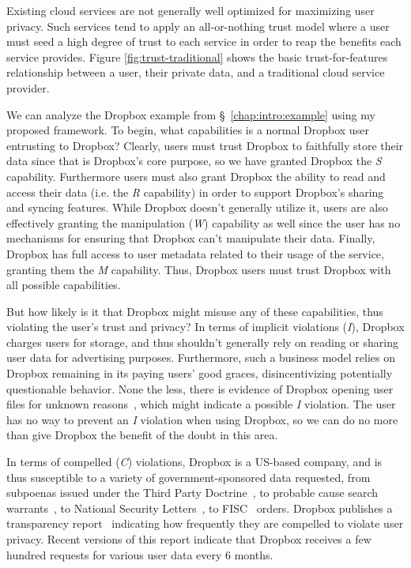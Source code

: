 Existing cloud services are not generally well optimized for
maximizing user privacy. Such services tend to apply an all-or-nothing
trust model where a user must seed a high degree of trust to each
service in order to reap the benefits each service provides. Figure
\ref{fig:trust-traditional} shows the basic trust-for-features
relationship between a user, their private data, and a traditional
cloud service provider.

We can analyze the Dropbox example from \S~\ref{chap:intro:example}
using my proposed framework. To begin, what capabilities is a normal
Dropbox user entrusting to Dropbox? Clearly, users must trust Dropbox
to faithfully store their data since that is Dropbox's core purpose,
so we have granted Dropbox the \emph{S} capability. Furthermore users
must also grant Dropbox the ability to read and access their data
(i.e. the \emph{R} capability) in order to support Dropbox's sharing
and syncing features. While Dropbox doesn't generally utilize it,
users are also effectively granting the manipulation (\emph{W})
capability as well since the user has no mechanisms for ensuring that
Dropbox can't manipulate their data. Finally, Dropbox has full access
to user metadata related to their usage of the service, granting them
the \emph{M} capability. Thus, Dropbox users must trust Dropbox with
all possible capabilities.

But how likely is it that Dropbox might misuse any of these
capabilities, thus violating the user's trust and privacy? In terms of
implicit violations (\emph{I}), Dropbox charges users for storage, and
thus shouldn't generally rely on reading or sharing user data for
advertising purposes. Furthermore, such a business model relies on
Dropbox remaining in its paying users' good graces, disincentivizing
potentially questionable behavior. None the less, there is evidence of
Dropbox opening user files for unknown
reasons~\cite{vintsurf-dropbox}, which might indicate a possible
\emph{I} violation. The user has no way to prevent an \emph{I}
violation when using Dropbox, so we can do no more than give Dropbox
the benefit of the doubt in this area.

In terms of compelled (\emph{C}) violations, Dropbox is a US-based
company, and is thus susceptible to a variety of government-sponsored
data requested, from subpoenas issued under the Third Party
Doctrine~\cite{thompson-thirdparty}, to probable cause search
warrants~\cite{us-constitution-amend4}, to National Security
Letters~\cite{fbi-nsl}, to FISC~\cite{fisc} orders. Dropbox publishes
a transparency report~\cite{dropbox-transparency} indicating how
frequently they are compelled to violate user privacy. Recent versions
of this report indicate that Dropbox receives a few hundred requests
for various user data every 6 months.

